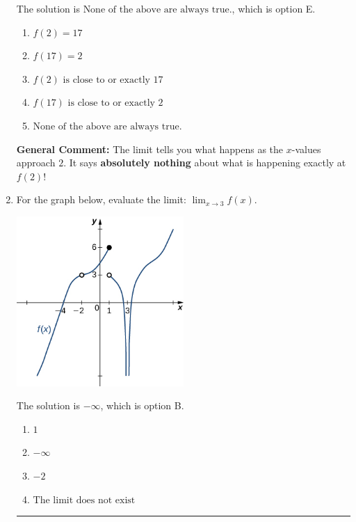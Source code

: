 \documentclass{extbook}[14pt]
\newcommand{\litem}[1]{\item #1

\rule{\textwidth}{0.4pt}}
\begin{document}
\begin{enumerate}
{The solution is \( \text{None of the above are always true.} \), which is option E.\begin{enumerate}[label=\Alph*.]
\item \( f(2) = 17 \)


\item \( f(17) = 2 \)


\item \( f(2) \text{ is close to or exactly } 17 \)


\item \( f(17) \text{ is close to or exactly } 2 \)


\item \( \text{None of the above are always true.} \)


\end{enumerate}

\textbf{General Comment:} The limit tells you what happens as the $x$-values approach $2$. It says \textbf{absolutely nothing} about what is happening exactly at $f(2)$!
}
\litem{
For the graph below, evaluate the limit: $ \displaystyle \lim_{x \rightarrow 3} f(x)$.

\begin{center}
    \includegraphics[width=0.5\textwidth]{../Figures/evaluateLimitGraphicallyCopyB.png}
\end{center}




The solution is \( -\infty \), which is option B.\begin{enumerate}[label=\Alph*.]
\item \( 1 \)


\item \( -\infty \)


\item \( -2 \)


\item \( \text{The limit does not exist} \)



\end{enumerate}}
\end{enumerate}
\end{document}

